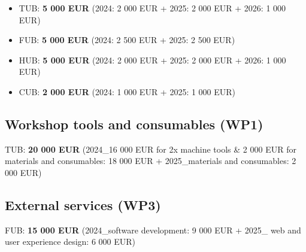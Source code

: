 \documentclass[
  12pt,
  a4paper,
]{article}
\providecommand{\tightlist}{%
  \setlength{\itemsep}{0pt}\setlength{\parskip}{0pt}}
\begin{document}
\begin{itemize}
\tightlist
\item
  TUB: \textbf{5 000 EUR} (2024: 2 000 EUR + 2025: 2 000 EUR + 2026: 1
  000 EUR)
\item
  FUB: \textbf{5 000 EUR} (2024: 2 500 EUR + 2025: 2 500 EUR)
\item
  HUB: \textbf{5 000 EUR} (2024: 2 000 EUR + 2025: 2 000 EUR + 2026: 1
  000 EUR)
\item
  CUB: \textbf{2 000 EUR} (2024: 1 000 EUR + 2025: 1 000 EUR)
\end{itemize}

\hypertarget{workshop-tools-and-consumables-wp1}{%
\subsection{Workshop tools and consumables
(WP1)}\label{workshop-tools-and-consumables-wp1}}

TUB: \textbf{20 000 EUR} (2024\_16 000 EUR for 2x machine tools \& 2 000
EUR for materials and consumables: 18 000 EUR + 2025\_materials and
consumables: 2 000 EUR)

\hypertarget{external-services-wp3}{%
\subsection{External services (WP3)}\label{external-services-wp3}}

FUB: \textbf{15 000 EUR} (2024\_software development: 9 000 EUR + 2025\_
web and user experience design: 6 000 EUR)
\end{document}
